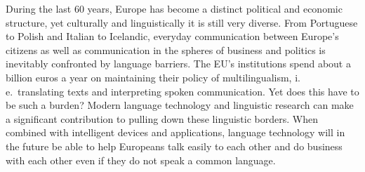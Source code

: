 {

\cleardoublepage



\makeatletter
{}
{
  \renewcommand*{\theHsection}{\thepart.\thesection}
}
\makeatother

\setcounter{section}{0}
\setcounter{figure}{0}
\setcounter{table}{0}


\cleardoublepage



\begin{multicols}{2}

    
During the last 60 years, Europe has become a distinct political and economic structure, yet culturally and linguistically it is still very diverse. From Portuguese to Polish and Italian to Icelandic, everyday communication between Europe’s citizens as well as communication in the spheres of business and politics is inevitably confronted by language barriers. 
The EU’s institutions spend about a billion euros a year on maintaining their policy of multilingualism, i.\,e.~translating texts and interpreting spoken communication. Yet does this have to be such a burden? Modern language technology and linguistic research can make a significant contribution to pulling down these linguistic borders. When combined with intelligent devices and applications, language technology will in the future be able to help Europeans talk easily to each other and do business with each other even if they do not speak a common language. 


\end{multicols}}
